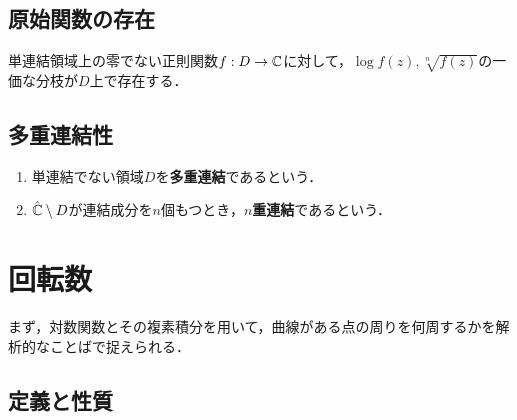 \documentclass[uplatex, dvipdfmx]{jsreport}
\begin{document}
\subsection{原始関数の存在}

\begin{corollary}
    単連結領域上の零でない正則関数$f:D\to\mathbb{C}$に対して，$\log f(z),\sqrt[n]{f(z)}$の一価な分枝が$D$上で存在する．
\end{corollary}

\subsection{多重連結性}

\begin{definition}\mbox{}
    \begin{enumerate}
        \item 単連結でない領域$D$を\textbf{多重連結}であるという．
        \item $\hat{\mathbb{C}}\setminus D$が連結成分を$n$個もつとき，\textbf{$n$重連結}であるという．
    \end{enumerate}
\end{definition}

\section{回転数}

\begin{tcolorbox}[colframe=ForestGreen, colback=ForestGreen!10!white,breakable,colbacktitle=ForestGreen!40!white,coltitle=black,fonttitle=\bfseries\sffamily,
title=]
    まず，対数関数とその複素積分を用いて，曲線がある点の周りを何周するかを解析的なことばで捉えられる．
\end{tcolorbox}

\subsection{定義と性質}
\end{document}
